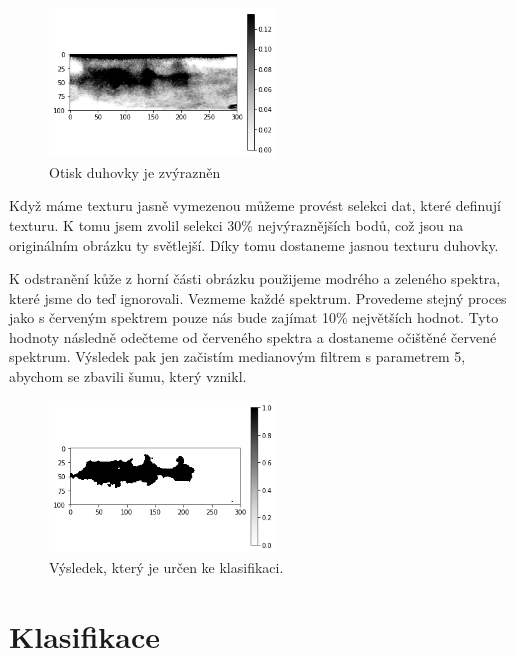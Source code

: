 \documentclass[a4paper,10pt,twocolumn]{article}
\begin{document}
\begin{figure}[H]
      \begin{center}
            \includegraphics[width=6cm]{normalized_red.png}
            \vspace{1mm}  
      \end{center}
      \caption{Otisk duhovky je zvýrazněn}
\label{fig3}
\end{figure}
Když máme texturu jasně vymezenou můžeme provést selekci dat, které definují texturu. K tomu jsem zvolil selekci 30\% nejvýraznějších bodů, což jsou na originálním obrázku ty světlejší. Díky tomu dostaneme jasnou texturu duhovky.\par
K odstranění kůže z horní části obrázku použijeme modrého a zeleného spektra, které jsme do teď ignorovali. Vezmeme každé spektrum. Provedeme stejný proces jako s červeným spektrem pouze nás bude zajímat 10\% největších hodnot. Tyto hodnoty následně odečteme od červeného spektra a dostaneme očištěné červené spektrum. Výsledek pak jen začistím medianovým filtrem s parametrem 5, abychom se zbavili šumu, který vznikl.

\begin{figure}[H]
      \begin{center}
            \includegraphics[width=6cm]{mask_diff.png}
            \vspace{1mm}  
      \end{center}
      \caption{Výsledek, který je určen ke klasifikaci.}
\label{fig5}
\end{figure}


\section{Klasifikace}
\end{document}
